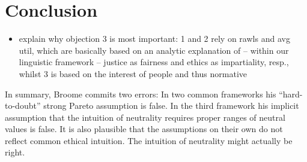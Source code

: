 \chapter{Conclusion}
\begin{comment}
\begin{flushleft} \tablefirsthead{} \tablehead{} \tabletail{} \tablelasttail{} \begin{supertabular}{|m{2.552cm}|m{2.552cm}|m{2.552cm}|m{2.553cm}|m{2.552cm}|m{2.55cm}|} \hline Contractarianism & Average Utilitarianism & Difference Principle & Note & Example & Compatible w/ neutrality\\\hline [2705?] & [2705?] & [274C?] & Utilitarianism with contractarian justification & \label{ref:RNDaJD6e3IOYj}Harsanyi 1955* & [2705?]\\\hline [2705?] & [274C?] & [2705?] & Difference principle with contractarian justification & \label{ref:RNDS2MPdVpPtJ}Rawls 2005 & [2705?]\\\hline [2705?] & [274C?] & [274C?] & Contractarianism with other or no welfare function & \label{ref:RNDlVodR5UJmv}Stemmer 2000 & [2705?]\\\hline [274C?] & [2705?] & [274C?] & Utilitarianism with other justification & \label{ref:RNDoJYZrQAT8L}Broome 2004 & [2705?]\\\hline [274C?] & [274C?] & [2705?] & Difference principle with other justification & cf. \label{ref:RNDUfrSm8hSWB}Pomerenke 2017** & [2705?]\\\hline [274C?] & [274C?] & [274C?] & Other moral framework & – & [2753?]\\\hline \end{supertabular} \end{flushleft} 

\bigskip 

* in an interpretation of ??? (maybe it was in SEP) 

** better replace by someone else. maybe edgeworth or so 
\end{comment}
\begin{itemize} \item explain why objection 3 is most important: 1 and 2 rely on rawls and avg util, which are basically based on an analytic explanation of – within our linguistic framework – justice as fairness and ethics as impartiality, resp., whilst 3 is based on the interest of people and thus normative \end{itemize} In summary, Broome commits two errors: In two common frameworks his “hard-to-doubt” strong Pareto assumption is false. In the third framework his implicit assumption that the intuition of neutrality requires proper ranges of neutral values is false. It is also plausible that the assumptions on their own do not reflect common ethical intuition. The intuition of neutrality might actually be right. 

